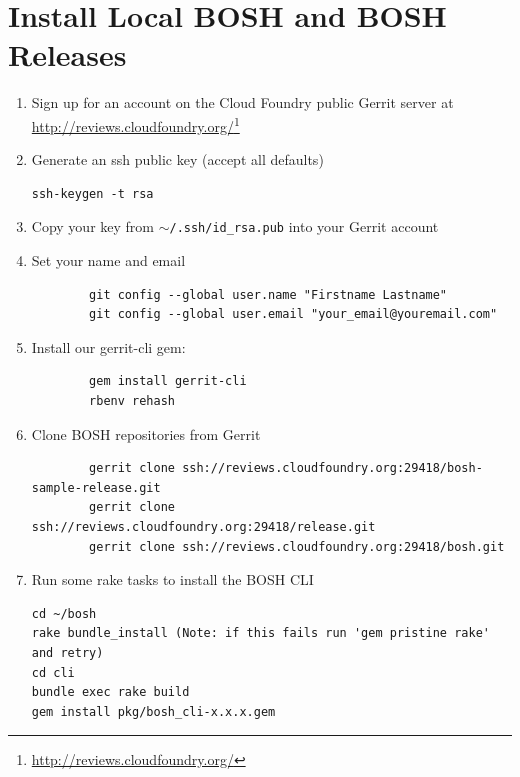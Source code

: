 \section{Install Local BOSH and BOSH Releases}
\label{installlocalboshandboshreleases}

\begin{enumerate}
\item Sign up for an account on the Cloud Foundry public Gerrit server at \href{http://reviews.cloudfoundry.org/}{http:/\slash reviews.cloudfoundry.org\slash }\footnote{\href{http://reviews.cloudfoundry.org/}{http:/\slash reviews.cloudfoundry.org\slash }}

\item Generate an ssh public key (accept all defaults)

\begin{verbatim}
ssh-keygen -t rsa
\end{verbatim}


\item Copy your key from \texttt{\ensuremath{\sim}\slash .ssh\slash id\_rsa.pub} into your Gerrit account

\item Set your name and email

\begin{verbatim}
        git config --global user.name "Firstname Lastname"
        git config --global user.email "your_email@youremail.com"
\end{verbatim}


\item Install our gerrit-cli gem:

\begin{verbatim}
        gem install gerrit-cli
        rbenv rehash
\end{verbatim}


\item Clone BOSH repositories from Gerrit

\begin{verbatim}
        gerrit clone ssh://reviews.cloudfoundry.org:29418/bosh-sample-release.git
        gerrit clone ssh://reviews.cloudfoundry.org:29418/release.git
        gerrit clone ssh://reviews.cloudfoundry.org:29418/bosh.git
\end{verbatim}


\item Run some rake tasks to install the BOSH CLI

\begin{verbatim}
cd ~/bosh
rake bundle_install (Note: if this fails run 'gem pristine rake' and retry)
cd cli
bundle exec rake build
gem install pkg/bosh_cli-x.x.x.gem
\end{verbatim}


\end{enumerate}

